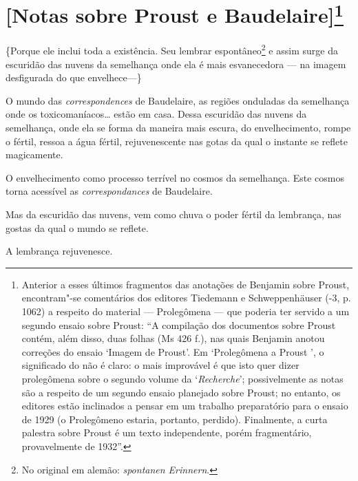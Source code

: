 \section{{[}Notas sobre Proust e Baudelaire{]}\protect\footnote[*]{\uppercase{A}nterior a esses
  últimos fragmentos das anotações de \uppercase{B}enjamin sobre \uppercase{P}roust,
  encontram"-se comentários dos editores \uppercase{T}iedemann e \uppercase{S}chweppenhäuser
  (-3, p. 1062) a respeito do material --- \uppercase{P}rolegômena ---
  que poderia ter servido a um segundo ensaio sobre \uppercase{P}roust: ``\uppercase{A}
  compilação dos documentos sobre \uppercase{P}roust contém, além disso, duas folhas
  (\uppercase{M}s 426 f.), nas quais \uppercase{B}enjamin anotou correções do ensaio
  `\uppercase{I}magem de \uppercase{P}roust'. \uppercase{E}m `\uppercase{P}rolegômena a \uppercase{P}roust
  ', o significado do  não é claro: o mais improvável é que isto
  quer dizer prolegômena sobre o segundo volume da `\emph{\uppercase{R}echerche}';
  possivelmente as notas são a respeito de um segundo ensaio planejado
  sobre \uppercase{P}roust; no entanto, os editores estão inclinados a pensar em um
  trabalho preparatório para o ensaio de 1929 (o \uppercase{P}rolegômeno  estaria,
  portanto, perdido). \uppercase{F}inalmente, a curta palestra sobre \uppercase{P}roust é um
  texto independente, porém fragmentário, provavelmente de 1932''. \versal{[N.~O.]}}}

\{Porque ele inclui toda a existência. Seu lembrar espontâneo\footnote{No original em alemão: \emph{spontanen Erinnern}. \versal{[N.~T.]}} e assim surge da escuridão das
nuvens da semelhança onde ela é mais esvanecedora --- na imagem
desfigurada do que envelhece---\}

O mundo das \emph{correspondences} de Baudelaire, as regiões onduladas
da semelhança onde os toxicomaníacos\ldots{} estão em casa. Dessa escuridão
das nuvens da semelhança, onde ela se forma da maneira mais escura, do
envelhecimento, rompe o fértil, ressoa a água fértil, rejuvenescente nas
gotas da qual o instante se reflete magicamente.

O envelhecimento como processo terrível no cosmos da semelhança. Este
cosmos torna acessível as \emph{correspondances} de Baudelaire.

Mas da escuridão das nuvens, vem como chuva o poder fértil da lembrança,
nas gostas da qual o mundo se reflete.

A lembrança rejuvenesce.

